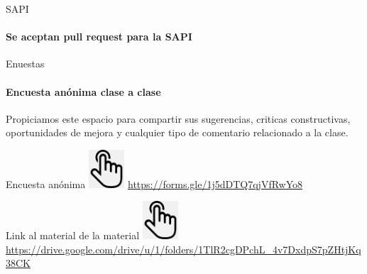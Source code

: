 \subtitle{Clase 5 - Applicaciones de DFT}

\begin{frame}[c]
\maketitle
{}
\end{frame}
 \begin{frame}{SAPI}
    \framesubtitle{Se aceptan pull request para la SAPI}
 \LARGE 
\end{frame}
 \begin{frame}{Enuestas}
    \framesubtitle{Encuesta anónima clase a clase}
    Propiciamos este espacio para compartir sus sugerencias, criticas constructivas, oportunidades de mejora y cualquier tipo de comentario relacionado a la clase.
    \begin{block}{Encuesta anónima}{
       \includegraphics[width=0.1\textwidth]{1_clase/click}
       \href{https://forms.gle/1j5dDTQ7qjVfRwYo8}{https://forms.gle/1j5dDTQ7qjVfRwYo8}
    }
       \end{block}
    \begin{block}{Link al material de la material}{
       \includegraphics[width=0.1\textwidth]{1_clase/click}
       \tiny{\href{https://drive.google.com/drive/u/1/folders/1TlR2cgDPchL\_4v7DxdpS7pZHtjKq38CK}{https://drive.google.com/drive/u/1/folders/1TlR2cgDPchL\_4v7DxdpS7pZHtjKq38CK}
    }
    }
       \end{block}
\end{frame}
